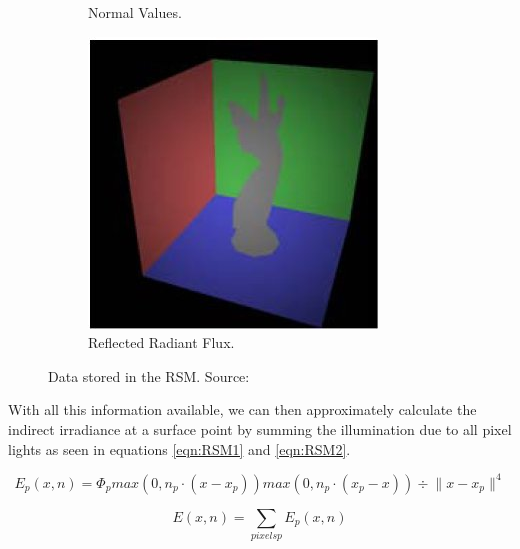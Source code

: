 \begin{figure}
\begin{subfigure}[b]{0.4\textwidth}
                \caption{Normal Values.}
                \label{fig:RSM2}
        \end{subfigure}
        \begin{subfigure}[b]{0.4\textwidth}
        		\centering
                \includegraphics[width=\textwidth]{RSM3.jpg}
                \caption{Reflected Radiant Flux.}
                \label{fig:RSM3}
        \end{subfigure}
        \caption{Data stored in the RSM. Source: \protect\cite{Dachsbacher2005}}\label{fig:RSM}
\end{figure}

With all this information available, we can then approximately calculate the indirect irradiance at a surface point by summing the illumination due to all pixel lights as seen in equations \ref{eqn:RSM1} and \ref{eqn:RSM2}.

\begin{equation}
E_{p} (x,n) = \Phi_{p} {max(0, n_{p} \cdot (x-x_{p})) max(0, n_{p} \cdot (x_{p} - x))  } \div {\| x-x_{p} \|^{4} } \label{eqn:RSM1}
\end{equation}

\begin{equation}
E(x,n) = \sum_{pixels p} E_{p}(x,n) \label{eqn:RSM2}
\end{equation}

